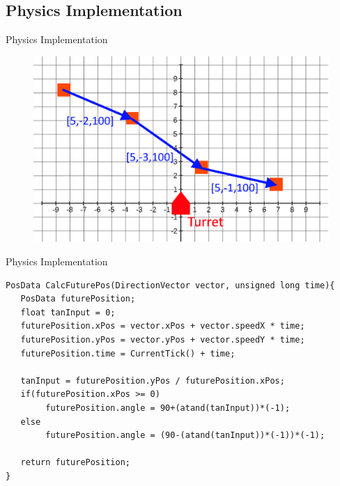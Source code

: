 \subsection{Physics Implementation}
\begin{frame}{Physics Implementation}

\begin{figure}[H]
	\includegraphics[scale=0.25]{figures/FPosCalc2.png}
\end{figure}

\end{frame}

\begin{frame}[fragile]{Physics Implementation}
\begin{center}
\begin{minipage}[H]{0.9\linewidth}
 \begin{lstlisting}
PosData CalcFuturePos(DirectionVector vector, unsigned long time){
   PosData futurePosition;
   float tanInput = 0;
   futurePosition.xPos = vector.xPos + vector.speedX * time;
   futurePosition.yPos = vector.yPos + vector.speedY * time;
   futurePosition.time = CurrentTick() + time;

   tanInput = futurePosition.yPos / futurePosition.xPos;
   if(futurePosition.xPos >= 0)
        futurePosition.angle = 90+(atand(tanInput))*(-1);
   else
        futurePosition.angle = (90-(atand(tanInput))*(-1))*(-1);
   
   return futurePosition;
}
 \end{lstlisting} 
\end{minipage}
\end{center}
\end{frame}